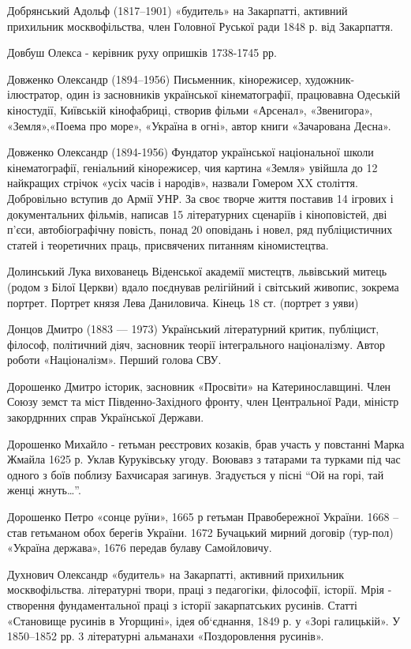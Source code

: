 Добрянський Адольф (1817–1901)  «будитель» на Закарпатті, активний прихильник москвофільства, член Головної Руської ради 1848 р. від Закарпаття.

Довбуш Олекса  - керівник руху опришків 1738-1745 рр. 

Довженко Олександр (1894–1956) Письменник, кінорежисер, художник-ілюстратор, один із засновників української кінематографії, працювавна Одеській кіностудії, Київській кінофабриці, створив фільми «Арсенал», «Звенигора», «Земля»,«Поема про море», «Україна в огні», автор книги «Зачарована Десна». 

Довженко Олександр (1894-1956) Фундатор української національної школи кінематографії, геніальний кінорежисер, чия картина «Земля» увійшла до 12 найкращих стрічок «усіх часів і народів», назвали Гомером XX століття. Добровільно вступив до Армії УНР. За своє творче життя поставив 14 ігрових і документальних фільмів, написав 15 літературних сценаріїв і кіноповістей, дві п'єси, автобіографічну повість, понад 20 оповідань і новел, ряд публіцистичних статей і теоретичних праць, присвячених питанням кіномистецтва.

Долинський Лука  вихованець Віденської академії мистецтв, львівський митець (родом з Білої Церкви) вдало поєднував релігійний і світський живопис, зокрема портрет. Портрет князя Лева Даниловича. Кінець 18 ст. (портрет з уяви) 

Донцов Дмитро (1883 — 1973) Український літературний критик, публіцист, філософ, політичний діяч, засновник теорії інтегрального націоналізму. Автор роботи «Націоналізм». Перший голова СВУ.

Дорошенко Дмитро історик, засновник «Просвіти» на Катеринославщині. Член Союзу земст та міст Південно-Західного фронту, член Центральної Ради, міністр закордрнних справ Української Держави. 

Дорошенко Михайло  - гетьман реєстрових козаків, брав участь у повстанні Марка Жмайла 1625 р. Уклав Куруківську угоду. Воювавз з татарами та турками під час одного з боїв поблизу Бахчисарая загинув. Згадується у пісні “Ой на горі, тай женці жнуть…”.

Дорошенко Петро  «сонце руїни», 1665 р гетьман Правобережної України. 1668 – став гетьманом обох берегів України. 1672 Бучацький мирний договір (тур-пол) «Україна держава», 1676 передав булаву Самойловичу.

Духнович Олександр «будитель» на Закарпатті, активний прихильник москвофільства. літературні твори, праці з педагогіки, філософії, історії. Мрія - створення фундаментальної праці з історії закарпатських русинів. Статті «Становище русинів в Угорщині», ідея об‘єднання, 1849 р. у «Зорі галицькій». У 1850–1852 рр. 3 літературні альманахи «Поздоровлення русинів».

